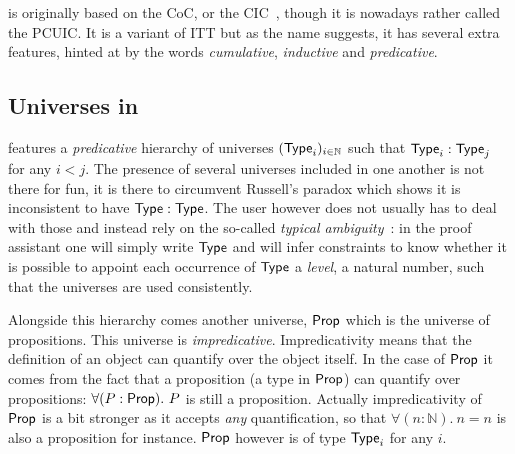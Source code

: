 \Coq is originally based on the \acrfull{CoC}, or the
\acrfull{CIC}~, though it is nowadays rather
called the \acrfull{PCUIC}.
It is a variant of \acrshort{ITT} but as the name suggests, it has several
extra features, hinted at by the words \emph{cumulative}, \emph{inductive}
and \emph{predicative}.

\subsection{Universes in \Coq}

\Coq features a \emph{predicative} hierarchy of universes
\((\mathsf{Type}_i)_{i \in \mathbb{N}}\) such that \(\mathsf{Type}_i : \mathsf{Type}_j\) for any
\(i < j\). The presence of several universes included in one another is not
there for fun, it is there to circumvent Russell's paradox which
shows it is inconsistent to have \(\mathsf{Type} : \mathsf{Type}\).
The \Coq user however does not usually has to deal with those and
instead rely on the so-called
\emph{typical ambiguity}~:
in the \Coq proof assistant one will simply write \(\mathsf{Type}\) and \Coq will infer
constraints to know whether it is possible to appoint each occurrence of
\(\mathsf{Type}\) a \emph{level}, \ie a natural number, such that the universes are used
consistently.

Alongside this hierarchy comes another universe, \(\mathsf{Prop}\) which is the universe
of propositions. This universe is \emph{impredicative}.
Impredicativity means that the definition of an object can quantify over the
object itself. In the case of \(\mathsf{Prop}\) it comes from the fact that a
proposition (\ie a type in \(\mathsf{Prop}\)) can quantify over propositions: \eg
\(\forall (P : \mathsf{Prop}).\ P\) is still a proposition.
Actually impredicativity of \(\mathsf{Prop}\) is a bit stronger as it accepts \emph{any}
quantification, so that \(\forall (n : \mathbb{N}).\ n = n\) is also a
proposition for instance.
\(\mathsf{Prop}\) however is of type \(\mathsf{Type}_i\) for any \(i\).

